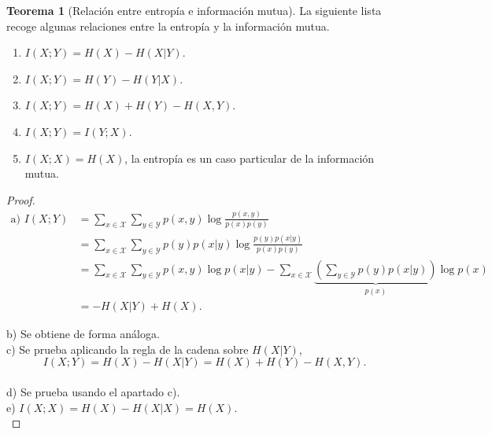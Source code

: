 \documentclass[12pt,a4paper]{report} %
\theoremstyle{definition}
\newtheorem{theorem}{Teorema}[section]
\begin{document}
\begin{theorem}[Relación entre entropía e información mutua]\label{t:ent_im}
  La siguiente lista recoge algunas relaciones entre la entropía y la información mutua.
\begin{enumerate}[label={\alph*)}]
  \item $I(X;Y) = H(X) - H(X|Y)$.
  \item $I(X;Y) = H(Y) - H(Y|X)$.
  \item $I(X;Y) = H(X) + H(Y) - H(X,Y)$.
  \item $I(X;Y) = I(Y;X)$.
  \item $I(X;X) = H(X)$, la entropía es un caso particular de la información mutua.
  \end{enumerate}
\end{theorem}
\begin{proof}
   
  \begin{align*}
    \text{a) }I(X;Y) &= \sum_{x \in \mathcal{X}}\sum_{y \in \mathcal{Y}}p(x,y) \log \frac{p(x,y)}{p(x)p(y)}\\[3pt] &= \sum_{x \in \mathcal{X}}\sum_{y \in \mathcal{Y}} p(y) p(x|y) \log \frac{p(y)p(x|y)}{p(x)p(y)}\\
    &= \sum_{x \in \mathcal{X}}\sum_{y \in \mathcal{Y}} p(x,y) \log p(x|y) - \sum_{x \in \mathcal{X}}\underbrace{\left ( \sum_{y \in \mathcal{Y}} p(y) p(x|y) \right)}_{p(x)} \log p(x)\\
    &= - H(X|Y) + H(X).
  \end{align*}
  
  b) Se obtiene de forma análoga.\\
  
  c) Se prueba aplicando la regla de la cadena sobre $H(X|Y)$, \[I(X;Y) = H(X) - H(X|Y) = H(X) + H(Y) - H(X,Y).\]\\[-20pt]
  
  d) Se prueba usando el apartado c).\\
  
  e) $I(X;X) = H(X) - H(X|X) = H(X)$.\\
  
\end{proof}
\end{document}

